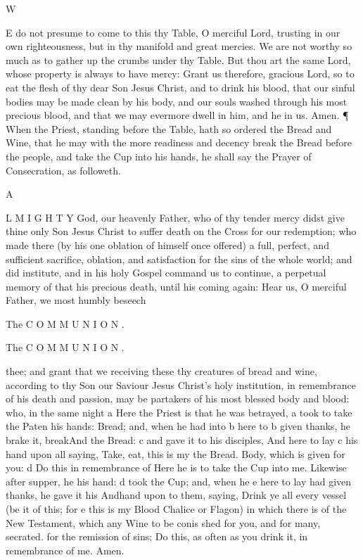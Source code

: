 W

E do not presume to come to this thy Table, O merciful Lord, trusting in our own righteousness, but in thy manifold and great mercies. We are not worthy so much as to gather up the crumbs under thy Table. But thou art the same Lord, whose property is always to have mercy: Grant us therefore, gracious Lord, so to eat the flesh of thy dear Son Jesus Christ, and to drink his blood, that our sinful bodies may be made clean by his body, and our souls washed through his most precious blood, and that we may evermore dwell in him, and he in us. Amen. ¶ When the Priest, standing before the Table, hath so ordered the Bread and Wine, that he may with the more readiness and decency break the Bread before the people, and take the Cup into his hands, he shall say the Prayer of Consecration, as followeth.

A

L M I G H T Y God, our heavenly Father, who of thy tender mercy didst give thine only Son Jesus Christ to suffer death on the Cross for our redemption; who made there (by his one oblation of himself once offered) a full, perfect, and sufficient sacrifice, oblation, and satisfaction for the sins of the whole world; and did institute, and in his holy Gospel command us to continue, a perpetual memory of that his precious death, until his coming again: Hear us, O merciful Father, we most humbly beseech

The C O M M U N I O N .

The C O M M U N I O N .

thee; and grant that we receiving these thy creatures of bread and wine, according to thy Son our Saviour Jesus Christ’s holy institution, in remembrance of his death and passion, may be partakers of his most blessed body and blood: who, in the same night a Here the Priest is that he was betrayed, a took to take the Paten his hands: Bread; and, when he had into b here to b given thanks, he brake it, breakAnd the Bread: c and gave it to his disciples, And here to lay c his hand upon all saying, Take, eat, this is my the Bread. Body, which is given for you: d Do this in remembrance of Here he is to take the Cup into me. Likewise after supper, he his hand: d took the Cup; and, when he e here to lay had given thanks, he gave it his Andhand upon to them, saying, Drink ye all every vessel (be it of this; for e this is my Blood Chalice or Flagon) in which there is of the New Testament, which any Wine to be conis shed for you, and for many, secrated. for the remission of sins; Do this, as often as you drink it, in remembrance of me. Amen.

